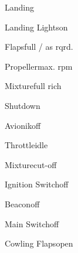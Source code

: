 \begin{checklist}{Landing}
  \item{Landing Lights}{on}
  \item{Flaps}{full / as rqrd.}
  \item{Propeller}{max. rpm}
  \item{Mixture}{full rich}
\end{checklist}

\begin{checklist}{Shutdown}
  \item{Avionik}{off}
  \item{Throttle}{idle}
  \item{Mixture}{cut-off}
  \item{Ignition Switch}{off}
  \item{Beacon}{off}
  \item{Main Switch}{off}
  \item{Cowling Flaps}{open}
\end{checklist}

